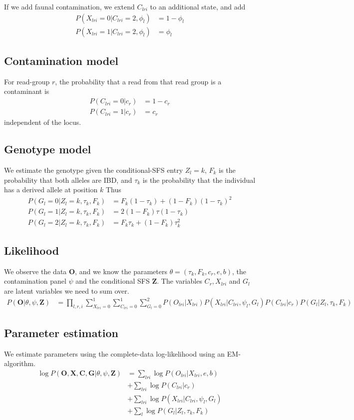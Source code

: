 \documentclass[10pt,a4paper]{article}
\begin{document}
If we add faunal contamination, we extend $C_{lri}$ to an additional state, and add
\begin{align}
P(X_{lri} = 0 | C_{lri} = 2, \phi_l) &= 1-\phi_l\nonumber\\ 
P(X_{lri} = 1 | C_{lri} = 2, \phi_l) &= \phi_l
\end{align}

\subsection*{Contamination model}
For read-group $r$, the probability that a read from that read group is a contaminant is 
\begin{align}
P(C_{lri} = 0 | c_r) &= 1-c_r\nonumber\\
P(C_{lri} = 1 | c_r) &= c_r
\end{align}
independent of the locus.

\subsection*{Genotype model}
We estimate the genotype given the conditional-SFS entry $Z_l=k$, $F_k$ is the probability that both alleles are IBD, and $\tau_k$ is the probability that the individual has a derived allele at position $k$
Thus
\begin{align}
P(G_l = 0| Z_l=k, \tau_k, F_k) &= F_k (1-\tau_k) + (1-F_k) (1-\tau_k)^2\nonumber\\
P(G_l = 1| Z_l=k, \tau_k, F_k) &= 2(1-F_k) \tau(1-\tau_k)\nonumber\\
P(G_l = 2| Z_l=k, \tau_k, F_k) &= F_k \tau_k + (1-F_k) \tau_k^2
\end{align}

\subsection*{Likelihood}
We observe the data $\mathbf{O}$, and we know the parameters $\theta = (\tau_k, F_k, c_r, e,b)$, the 
contamination panel $\psi$ and the conditional SFS $\mathbf{Z}$. The variables
$C_r, X_{lri}$ and $G_l$ are latent variables we need to sum over.
\begin{align}
P(\mathbf{O} | \theta, \psi, \mathbf{Z}) &= 
\prod_{l, r, i}\sum_{X_{lri}=0}^1\sum_{C_{lri}=0}^1\sum_{G_{l}=0}^2 P(O_{lri} |X_{lri}) P(X_{lri} | C_{lri}, \psi_l, G_l) P(C_{lri} | c_r) P(G_l | Z_l, \tau_k, F_k)
\end{align}

\subsection*{Parameter estimation}
We estimate parameters using the complete-data log-likelihood using an EM-algorithm.
\begin{align*}
\log P(\mathbf{O}, \mathbf{X}, \mathbf{C}, \mathbf{G} | \theta, \psi, \mathbf{Z}) &= 
\sum_{lri} \log P(O_{lri} | X_{lri}, e, b)\\
&+ \sum_{lri}\log P(C_{lri} | c_r)\\
&+ \sum_{lri}\log P(X_{lri} | C_{lri}, \psi_l, G_l)\\
&+ \sum_{l} \log P( G_l | Z_l, \tau_k, F_k)
\end{align*}
\end{document}
